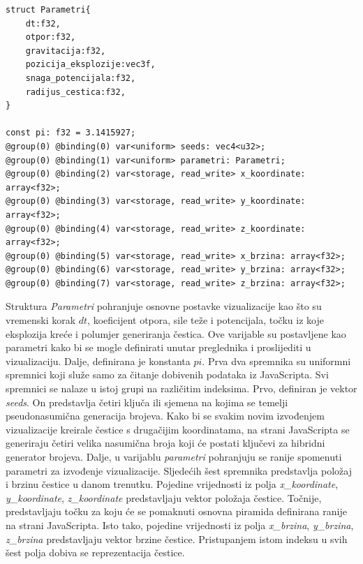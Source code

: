 \documentclass{foi}
\begin{document}
\begin{verbatim}
struct Parametri{
	dt:f32,
	otpor:f32,
	gravitacija:f32,
	pozicija_eksplozije:vec3f,
	snaga_potencijala:f32,
	radijus_cestica:f32,
}

const pi: f32 = 3.1415927;
@group(0) @binding(0) var<uniform> seeds: vec4<u32>;
@group(0) @binding(1) var<uniform> parametri: Parametri;
@group(0) @binding(2) var<storage, read_write> x_koordinate: array<f32>;
@group(0) @binding(3) var<storage, read_write> y_koordinate: array<f32>;
@group(0) @binding(4) var<storage, read_write> z_koordinate: array<f32>;
@group(0) @binding(5) var<storage, read_write> x_brzina: array<f32>;
@group(0) @binding(6) var<storage, read_write> y_brzina: array<f32>;
@group(0) @binding(7) var<storage, read_write> z_brzina: array<f32>;
\end{verbatim}

Struktura \textit{Parametri} pohranjuje osnovne postavke vizualizacije kao što su vremenski korak $dt$, koeficijent otpora, sile teže i potencijala, točku iz koje eksplozija kreće i polumjer generiranja čestica. Ove varijable su postavljene kao parametri kako bi se mogle definirati unutar preglednika i proslijediti u vizualizaciju. Dalje, definirana je konstanta $pi$. Prva dva spremnika su uniformni spremnici koji služe samo za čitanje dobivenih podataka iz JavaScripta. Svi spremnici se nalaze u istoj grupi na različitim indeksima. Prvo, definiran je vektor \textit{seeds}. On predstavlja četiri ključa ili sjemena na kojima se temelji pseudonasumična generacija brojeva. Kako bi se svakim novim izvođenjem vizualizacije kreirale čestice s drugačijim koordinatama, na strani JavaScripta se generiraju četiri velika nasumična broja koji će postati ključevi za hibridni generator brojeva. Dalje, u varijablu \textit{parametri} pohranjuju se ranije spomenuti parametri za izvođenje vizualizacije. Sljedećih šest spremnika predstavlja položaj i brzinu čestice u danom trenutku. Pojedine vrijednosti iz polja \textit{x\_koordinate}, \textit{y\_koordinate}, \textit{z\_koordinate} predstavljaju vektor položaja čestice. Točnije, predstavljaju točku za koju će se pomaknuti osnovna piramida definirana ranije na strani JavaScripta. Isto tako, pojedine vrijednosti iz polja \textit{x\_brzina}, \textit{y\_brzina}, \textit{z\_brzina} predstavljaju vektor brzine čestice. Pristupanjem istom indeksu u svih šest polja dobiva se reprezentacija čestice. 
\end{document}
